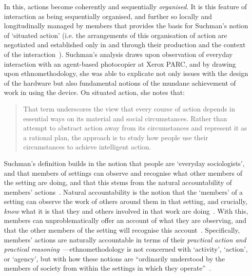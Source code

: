 In this, actions become coherently and sequentially \textit{organised}.
\label{line:suchman}It is this feature of interaction as being sequentially organised, and further so locally and longitudinally managed by members that provides the basis for Suchman's notion of `situated action' (i.e. the arrangements of this organisation of action are negotiated and established only in and through their production and the context of the interaction~\citep{Button1995a,Nguyen2008}).
Suchman's analysis draws upon observation of everyday interaction with an agent-based photocopier at Xerox PARC, and by drawing upon ethnomethodology, she was able to explicate not only issues with the design of the hardware but also fundamental notions of the mundane achievement of work in using the device. On situated action, she notes that:
\begin{quote}
    That term underscores the view that every course of action depends in essential ways on its material and social circumstances.
    Rather than attempt to abstract action away from its circumstances and represent it as a rational plan, the approach is to study how people use their circumstances to achieve intelligent action.
\end{quote}
Suchman's definition builds in the notion that people are `everyday sociologists', and that members of settings can observe and recognise what other members of the setting are doing, and that this stems from the natural accountability of members' actions~\citep{Berger1966}.
\label{line:naturalaccountability}Natural accountability is the notion that the `members' of a setting can observe the work of others around them in that setting, and crucially, \textit{know} what it is that they and others involved in that work are doing~\citep[pp. 1--34]{Garfinkel1967}.
With this, members can unproblematically offer an account of what they are observing, and that the other members of the setting will recognise this account~\citep[pp. 1--34]{Garfinkel1967}.
Specifically, members' actions are naturally accountable in terms of their \textit{practical action and practical reasoning}~\citep{Garfinkel1970}---ethnomethodology is not concerned with `activity', `action', or `agency', but with how these notions are ``ordinarily understood by the members of society from within the settings in which they operate''~\citep[p. 29]{Crabtree2012}.
